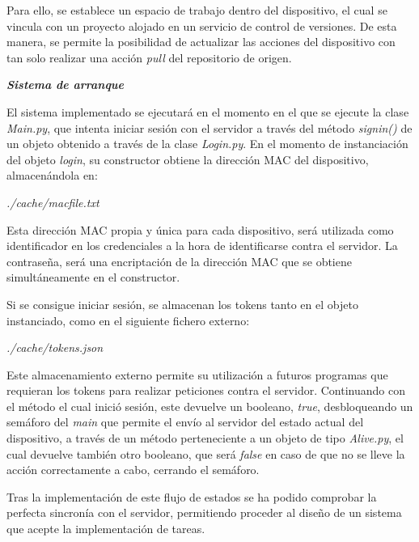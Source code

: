        Para ello, se establece un espacio de trabajo dentro del dispositivo, el cual se vincula con un proyecto alojado en un servicio de control de versiones.
        De esta manera, se permite la posibilidad de actualizar las acciones del dispositivo con tan solo realizar una acción \textit{pull} del repositorio de origen.
        
        \textit{\textbf{Sistema de arranque}}
        
        El sistema implementado se ejecutará en el momento en el que se ejecute la clase \textit{Main.py}, que intenta iniciar sesión con el servidor a través del método \textit{signin()} de un objeto obtenido a través de la clase \textit{Login.py}.
        En el momento de instanciación del objeto \textit{login}, su constructor obtiene la dirección MAC del dispositivo, almacenándola en: 
        \begin{center}
        \textit{./cache/macfile.txt}
        \end{center}
        
        Esta dirección MAC propia y única para cada dispositivo, será utilizada como identificador en los credenciales a la hora de identificarse contra el servidor.
        La contraseña, será una encriptación de la dirección MAC que se obtiene simultáneamente en el constructor.
        
        Si se consigue iniciar sesión, se almacenan los tokens tanto en el objeto instanciado, como en el siguiente fichero externo:
        \begin{center}
        \textit{./cache/tokens.json}
        \end{center}
        
        Este almacenamiento externo permite su utilización a futuros programas que requieran los tokens para realizar peticiones contra el servidor. Continuando con el método el cual inició sesión, este devuelve un booleano, \textit{true}, desbloqueando un semáforo del \textit{main} que permite el envío al servidor del estado actual del dispositivo, a través de un método perteneciente a un objeto de tipo \textit{Alive.py}, el cual devuelve también otro booleano, que será \textit{false} en caso de que no se lleve la acción correctamente a cabo, cerrando el semáforo.
        
        Tras la implementación de este flujo de estados se ha podido comprobar la perfecta sincronía con el servidor, permitiendo proceder al diseño de un sistema que acepte la implementación de tareas.
        
